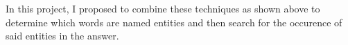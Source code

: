 In this project, I proposed to combine these techniques as shown above to determine which words are named entities and then search for the occurence of said entities in the answer.


